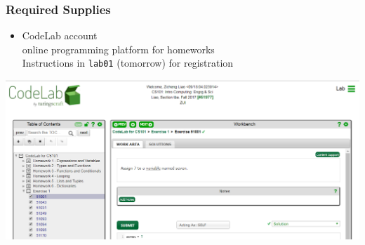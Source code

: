 \documentclass[11pt]{beamer}
\begin{document}
\begin{frame}
  \frametitle{Required Supplies}

  \begin{itemize}
    \item CodeLab account \\ \textcolor{\CSGradBot}{\footnotesize\hspace{1em} online programming platform for homeworks}
    					\\ \textcolor{\CSGradBot}{\footnotesize\hspace{1em} Instructions in \texttt{lab01} (tomorrow) for registration}
  \end{itemize}
  \vspace{2mm}
  \hspace{12mm}\includegraphics[height=0.4\textheight]{./img/codelab.png}
\end{frame}
\end{document}
